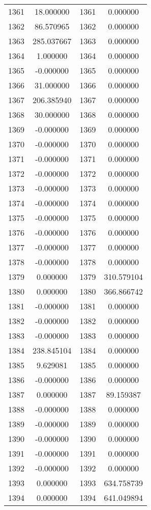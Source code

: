 \documentclass[12pt]{article}
\begin{document}
\begin{longtable}{@{}cccc@{}}
1361 & 18.000000 & 1361 & 0.000000 \\
1362 & 86.570965 & 1362 & 0.000000 \\
1363 & 285.037667 & 1363 & 0.000000 \\
1364 & 1.000000 & 1364 & 0.000000 \\
1365 & -0.000000 & 1365 & 0.000000 \\
1366 & 31.000000 & 1366 & 0.000000 \\
1367 & 206.385940 & 1367 & 0.000000 \\
1368 & 30.000000 & 1368 & 0.000000 \\
1369 & -0.000000 & 1369 & 0.000000 \\
1370 & -0.000000 & 1370 & 0.000000 \\
1371 & -0.000000 & 1371 & 0.000000 \\
1372 & -0.000000 & 1372 & 0.000000 \\
1373 & -0.000000 & 1373 & 0.000000 \\
1374 & -0.000000 & 1374 & 0.000000 \\
1375 & -0.000000 & 1375 & 0.000000 \\
1376 & -0.000000 & 1376 & 0.000000 \\
1377 & -0.000000 & 1377 & 0.000000 \\
1378 & -0.000000 & 1378 & 0.000000 \\
1379 & 0.000000 & 1379 & 310.579104 \\
1380 & 0.000000 & 1380 & 366.866742 \\
1381 & -0.000000 & 1381 & 0.000000 \\
1382 & -0.000000 & 1382 & 0.000000 \\
1383 & -0.000000 & 1383 & 0.000000 \\
1384 & 238.845104 & 1384 & 0.000000 \\
1385 & 9.629081 & 1385 & 0.000000 \\
1386 & -0.000000 & 1386 & 0.000000 \\
1387 & 0.000000 & 1387 & 89.159387 \\
1388 & -0.000000 & 1388 & 0.000000 \\
1389 & -0.000000 & 1389 & 0.000000 \\
1390 & -0.000000 & 1390 & 0.000000 \\
1391 & -0.000000 & 1391 & 0.000000 \\
1392 & -0.000000 & 1392 & 0.000000 \\
1393 & 0.000000 & 1393 & 634.758739 \\
1394 & 0.000000 & 1394 & 641.049894 \\

\end{longtable}
\end{document}
